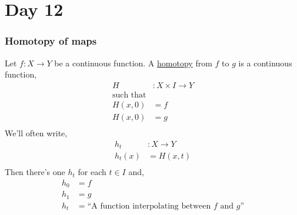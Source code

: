 \documentclass[../notes.tex]{subfiles}
\begin{document}
\section{Day 12}
    \subsubsection{Homotopy of maps}
            \begin{definition}
            Let $f: X\rightarrow Y$ be a continuous function.
            A \underline{homotopy} from $f$ to $g$ is a continuous function,
            \begin{align*}
                H&:X\times I \rightarrow Y\\
                \text{such that}&\\
                H(x,0)&=f\\
                H(x,0)&=g\\
            \end{align*}
            We'll often write,
            \begin{align*}
                h_t&:X \rightarrow Y\\
                h_t(x)&=H(x,t)\\
            \end{align*}
            Then there's one $h_t$ for each $t\in I$ and,
            \begin{align*}
                h_0&=f\\
                h_1&=g\\
                h_t&=\text{``A function interpolating between $f$ and $g$''}\\
            \end{align*}
            \end{definition}
\end{document}
